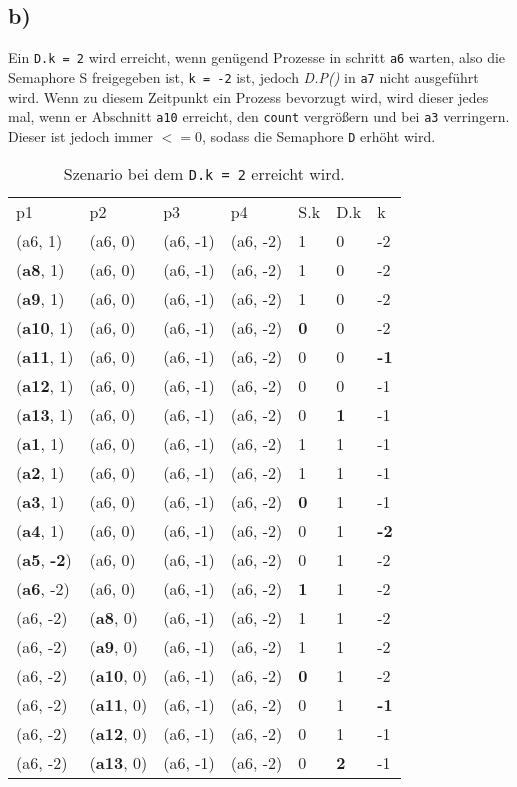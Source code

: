 \subsection*{b)}
Ein \texttt{D.k = 2} wird erreicht, wenn genügend Prozesse in schritt \texttt{a6} warten, also die Semaphore S freigegeben ist, \texttt{k = -2} ist, jedoch \textit{D.P()} in \texttt{a7} nicht ausgeführt wird. Wenn zu diesem Zeitpunkt ein Prozess bevorzugt wird, wird dieser jedes mal, wenn er Abschnitt \texttt{a10} erreicht, den \texttt{count} vergrößern und bei \texttt{a3} verringern. Dieser ist jedoch immer $<= 0$, sodass die Semaphore \texttt{D} erhöht wird.
\begin{table}[h]
\centering
\caption{Szenario bei dem \texttt{D.k = 2} erreicht wird.}
\label{1b}
\begin{tabular}{lllllll}
p1 & p2 & p3 & p4 & S.k & D.k & k \\
(a6, 1)   & (a6, 0)   & (a6, -1)   & (a6, -2)   & 1 & 0 & -2 \\
(\textbf{a8}, 1)   & (a6, 0)   & (a6, -1)   & (a6, -2)   & 1 & 0 & -2 \\
(\textbf{a9}, 1)   & (a6, 0)   & (a6, -1)   & (a6, -2)   & 1 & 0 & -2 \\
(\textbf{a10}, 1)   & (a6, 0)   & (a6, -1)   & (a6, -2)   & \textbf{0} & 0 & -2 \\
(\textbf{a11}, 1)   & (a6, 0)   & (a6, -1)   & (a6, -2)   & 0  & 0 & \textbf{-1} \\
(\textbf{a12}, 1)   & (a6, 0)   & (a6, -1)   & (a6, -2)   & 0 & 0 & -1 \\
(\textbf{a13}, 1)   & (a6, 0)   & (a6, -1)   & (a6, -2)   & 0 & \textbf{1} & -1 \\
(\textbf{a1}, 1)   & (a6, 0)   & (a6, -1)   & (a6, -2)   & 1 & 1 & -1 \\
(\textbf{a2}, 1)   & (a6, 0)   & (a6, -1)   & (a6, -2)   & 1 & 1 & -1 \\
(\textbf{a3}, 1)   & (a6, 0)   & (a6, -1)   & (a6, -2)   & \textbf{0} & 1 & -1 \\
(\textbf{a4}, 1)   & (a6, 0)   & (a6, -1)   & (a6, -2)   & 0 & 1 & \textbf{-2} \\
(\textbf{a5}, \textbf{-2})   & (a6, 0)   & (a6, -1)   & (a6, -2)   & 0 & 1 & -2 \\
(\textbf{a6}, -2)   & (a6, 0)   & (a6, -1)   & (a6, -2)   & \textbf{1} & 1 & -2 \\
(a6, -2)   & (\textbf{a8}, 0)   & (a6, -1)   & (a6, -2)   & 1 & 1 & -2 \\
(a6, -2)   & (\textbf{a9}, 0)   & (a6, -1)   & (a6, -2)   & 1 & 1 & -2 \\
(a6, -2)   & (\textbf{a10}, 0)   & (a6, -1)   & (a6, -2)   & \textbf{0} & 1 & -2 \\
(a6, -2)   & (\textbf{a11}, 0)   & (a6, -1)   & (a6, -2)   & 0 & 1 & \textbf{-1} \\
(a6, -2)   & (\textbf{a12}, 0)   & (a6, -1)   & (a6, -2)   & 0 & 1 & -1 \\
(a6, -2)   & (\textbf{a13}, 0)   & (a6, -1)   & (a6, -2)   & 0 & \textbf{2} & -1 \\
\end{tabular}
\end{table}

